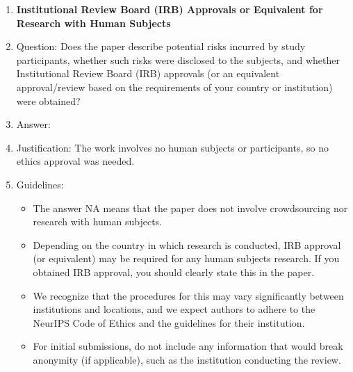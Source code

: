 \begin{enumerate}
\item {\bf Institutional Review Board (IRB) Approvals or Equivalent for Research with Human Subjects}
    \item[] Question: Does the paper describe potential risks incurred by study participants, whether such risks were disclosed to the subjects, and whether Institutional Review Board (IRB) approvals (or an equivalent approval/review based on the requirements of your country or institution) were obtained?
    \item[] Answer: \answerNA{}
    \item[] Justification: The work involves no human subjects or participants, so no ethics approval was needed.
    \item[] Guidelines:
    \begin{itemize}
        \item The answer NA means that the paper does not involve crowdsourcing nor research with human subjects.
        \item Depending on the country in which research is conducted, IRB approval (or equivalent) may be required for any human subjects research. If you obtained IRB approval, you should clearly state this in the paper.
        \item We recognize that the procedures for this may vary significantly between institutions and locations, and we expect authors to adhere to the NeurIPS Code of Ethics and the guidelines for their institution.
        \item For initial submissions, do not include any information that would break anonymity (if applicable), such as the institution conducting the review.
    \end{itemize}

\end{enumerate}
